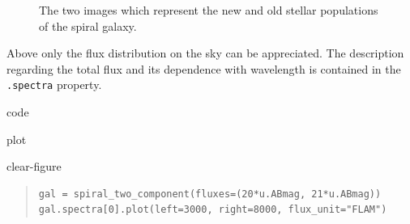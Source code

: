 \begin{figure}[H]
\noindent{}\label{fig-scopesim-templates-galaxy}

\caption{The two images which represent the new and old stellar populations of the spiral galaxy.}
\end{figure}

Above only the flux distribution on the sky can be appreciated. The description regarding the total flux
and its dependence with wavelength is contained in the \texttt{.spectra} property.

\label{scopesim-templates-galaxy-spectra}
\begin{DUclass}{code}
\begin{DUclass}{plot}
\begin{DUclass}{clear-figure}
\begin{quote}
\begin{alltt}
\begin{lstlisting}[frame=single]
gal = spiral_two_component(fluxes=(20*u.ABmag, 21*u.ABmag))
gal.spectra[0].plot(left=3000, right=8000, flux_unit="FLAM")
\end{lstlisting}
\end{alltt}
\end{quote}
\end{DUclass}
\end{DUclass}
\end{DUclass}

